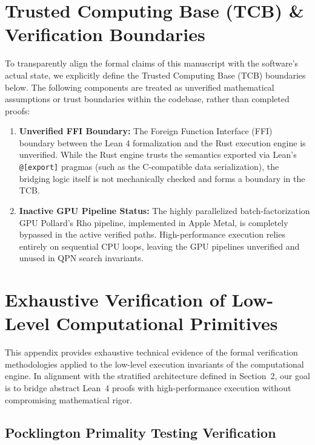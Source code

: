 \appendix
\section{Trusted Computing Base (TCB) \& Verification Boundaries}
\label{app:tcb}

To transparently align the formal claims of this manuscript with the software's actual state, we explicitly define the Trusted Computing Base (TCB) boundaries below. The following components are treated as unverified mathematical assumptions or trust boundaries within the codebase, rather than completed proofs:

\begin{enumerate}
    \item \textbf{Unverified FFI Boundary:} The Foreign Function Interface (FFI) boundary between the Lean 4 formalization and the Rust execution engine is unverified. While the Rust engine trusts the semantics exported via Lean's \texttt{@[export]} pragmas (such as the C-compatible data serialization), the bridging logic itself is not mechanically checked and forms a boundary in the TCB.
    
    \item \textbf{Inactive GPU Pipeline Status:} The highly parallelized batch-factorization GPU Pollard's Rho pipeline, implemented in Apple Metal, is completely bypassed in the active verified paths. High-performance execution relies entirely on sequential CPU loops, leaving the GPU pipelines unverified and unused in QPN search invariants.
\end{enumerate}

\section{Exhaustive Verification of Low-Level Computational Primitives}
\label{app:verification}

This appendix provides exhaustive technical evidence of the formal verification methodologies applied to the low-level execution invariants of the computational engine. In alignment with the stratified architecture defined in Section~2, our goal is to bridge abstract Lean~4 proofs with high-performance execution without compromising mathematical rigor.

\subsection{Pocklington Primality Testing Verification}
\label{app:subsec:miller_rabin}

